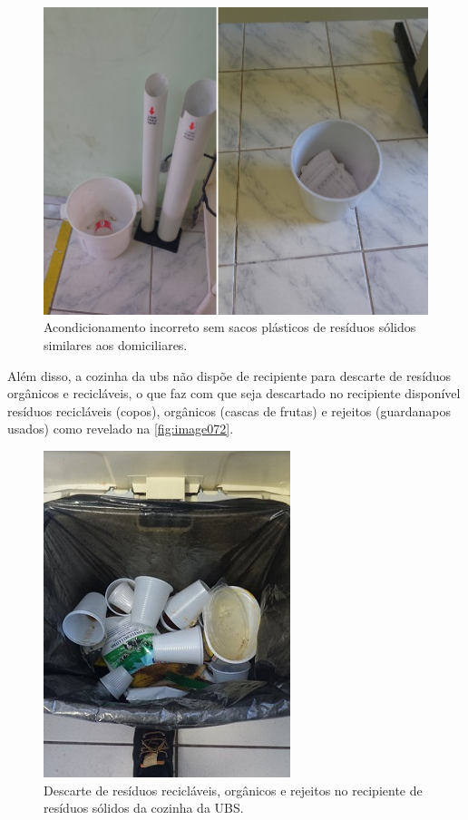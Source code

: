 	
	\begin{figure}
		\centering
		\includegraphics[width=0.75\linewidth]{produtos/prodtres/image070_71}
		\caption{Acondicionamento incorreto sem sacos plásticos de resíduos sólidos similares aos domiciliares.}
		\label{fig:image070_71}
	\end{figure}
	
	
	Além disso, a cozinha da \gls{ubs} não dispõe de recipiente para descarte de resíduos orgânicos e recicláveis, o que faz com que seja descartado no recipiente disponível resíduos recicláveis (copos), orgânicos (cascas de frutas) e rejeitos (guardanapos usados) como revelado na \autoref{fig:image072}. 
	
	\begin{figure}
		\centering
		\includegraphics[width=0.75\linewidth]{produtos/prodtres/image072}
		\caption{Descarte de resíduos recicláveis, orgânicos e rejeitos no recipiente de resíduos sólidos da cozinha da UBS.}
		\label{fig:image072}
	\end{figure}
	
